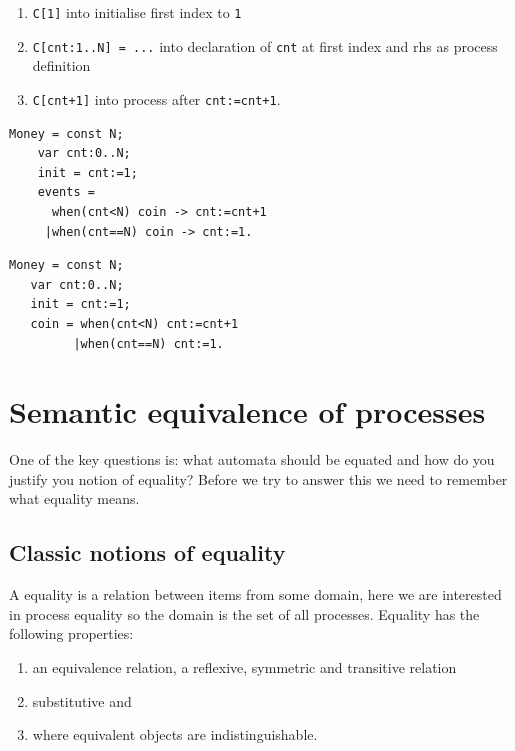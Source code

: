 \documentclass[]{article}
\begin{document}
{\begin{minipage}{0.45\textwidth}
 \end{minipage}




\begin{enumerate}
\item \verb|C[1]| into initialise first index to \verb|1|
\item  \verb|C[cnt:1..N] = ...|  into declaration of \verb|cnt| at first index and rhs as process definition
\item \verb|C[cnt+1]| into  process after \verb|cnt:=cnt+1|.
\end{enumerate}

\begin{center}\begin{minipage}{0.45\textwidth}
\begin{verbatim}
Money = const N;
    var cnt:0..N;
    init = cnt:=1;
    events =
      when(cnt<N) coin -> cnt:=cnt+1
     |when(cnt==N) coin -> cnt:=1.
\end{verbatim}
\end{minipage}
\begin{minipage}{0.45\textwidth}
\begin{verbatim}
Money = const N;
   var cnt:0..N;
   init = cnt:=1;
   coin = when(cnt<N) cnt:=cnt+1
         |when(cnt==N) cnt:=1.
  \end{verbatim}
\end{minipage} \end{center}
}
\newpage
\section{Semantic equivalence  of processes}
One of the key questions is:  what automata should be equated and how do you justify you notion of equality? Before we try to answer this we need to remember what equality means.

 \subsection{Classic notions of equality}   A equality is a relation between  items from some domain, here we are interested in process equality so the domain is the set of all processes. Equality has the following properties:
 \begin{enumerate}
 \item an equivalence relation, a reflexive, symmetric and transitive relation
 \item substitutive and
 \item where equivalent objects are indistinguishable.
 \end{enumerate}
\end{document}

